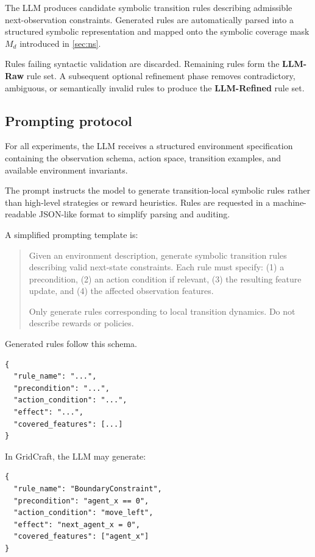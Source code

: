 \documentclass{article}
\theoremstyle{plain}
\theoremstyle{definition}
\theoremstyle{remark}
\begin{document}
The LLM produces candidate symbolic transition rules describing admissible
next-observation constraints. Generated rules are automatically parsed into a
structured symbolic representation and mapped onto the symbolic coverage mask
$M_d$ introduced in \autoref{sec:ns}.

Rules failing syntactic validation are discarded. Remaining rules form the
\textbf{LLM-Raw} rule set. A subsequent optional refinement phase removes
contradictory, ambiguous, or semantically invalid rules to produce the
\textbf{LLM-Refined} rule set.

\subsection{Prompting protocol}

For all experiments, the LLM receives a structured environment specification containing the observation schema, action space, transition examples, and available environment invariants.

The prompt instructs the model to generate transition-local symbolic rules
rather than high-level strategies or reward heuristics. Rules are requested in
a machine-readable JSON-like format to simplify parsing and auditing.

A simplified prompting template is:

\begin{quote}
  \small
  Given an environment description, generate symbolic transition
  rules describing valid next-state constraints. Each rule must specify:
  (1) a precondition,
  (2) an action condition if relevant,
  (3) the resulting feature update,
  and
  (4) the affected observation features.

  Only generate rules corresponding to local transition dynamics. Do not
  describe rewards or policies.
\end{quote}

Generated rules follow this schema.

\begin{verbatim}
{
  "rule_name": "...",
  "precondition": "...",
  "action_condition": "...",
  "effect": "...",
  "covered_features": [...]
}
\end{verbatim}

In GridCraft, the LLM may generate:

\begin{verbatim}
{
  "rule_name": "BoundaryConstraint",
  "precondition": "agent_x == 0",
  "action_condition": "move_left",
  "effect": "next_agent_x = 0",
  "covered_features": ["agent_x"]
}
\end{verbatim}
\end{document}
